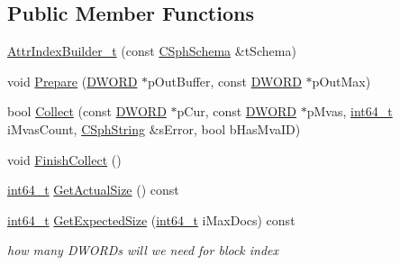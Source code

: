\subsection*{Public Member Functions}
\begin{DoxyCompactItemize}
\item 
\hyperlink{classAttrIndexBuilder__t_a71d062d94bfdbb5e61d8c8fbbb336bfe}{Attr\-Index\-Builder\-\_\-t} (const \hyperlink{classCSphSchema}{C\-Sph\-Schema} \&t\-Schema)
\item 
void \hyperlink{classAttrIndexBuilder__t_ae28f6c66df2182b4e243ec47123c2fd4}{Prepare} (\hyperlink{sphinxstd_8h_a798af1e30bc65f319c1a246cecf59e39}{D\-W\-O\-R\-D} $\ast$p\-Out\-Buffer, const \hyperlink{sphinxstd_8h_a798af1e30bc65f319c1a246cecf59e39}{D\-W\-O\-R\-D} $\ast$p\-Out\-Max)
\item 
bool \hyperlink{classAttrIndexBuilder__t_ae6b926b095b016cf4f5de34815acf871}{Collect} (const \hyperlink{sphinxstd_8h_a798af1e30bc65f319c1a246cecf59e39}{D\-W\-O\-R\-D} $\ast$p\-Cur, const \hyperlink{sphinxstd_8h_a798af1e30bc65f319c1a246cecf59e39}{D\-W\-O\-R\-D} $\ast$p\-Mvas, \hyperlink{sphinxstd_8h_a996e72f71b11a5bb8b3b7b6936b1516d}{int64\-\_\-t} i\-Mvas\-Count, \hyperlink{structCSphString}{C\-Sph\-String} \&s\-Error, bool b\-Has\-Mva\-I\-D)
\item 
void \hyperlink{classAttrIndexBuilder__t_ad51162d55c70e1f3e3c074aa7d135031}{Finish\-Collect} ()
\item 
\hyperlink{sphinxstd_8h_a996e72f71b11a5bb8b3b7b6936b1516d}{int64\-\_\-t} \hyperlink{classAttrIndexBuilder__t_ae197f9fe3698f40469af24e9a67539de}{Get\-Actual\-Size} () const 
\item 
\hyperlink{sphinxstd_8h_a996e72f71b11a5bb8b3b7b6936b1516d}{int64\-\_\-t} \hyperlink{classAttrIndexBuilder__t_a23471c5dceee242b6aa48546e70b0049}{Get\-Expected\-Size} (\hyperlink{sphinxstd_8h_a996e72f71b11a5bb8b3b7b6936b1516d}{int64\-\_\-t} i\-Max\-Docs) const 
\begin{DoxyCompactList}\small\item\em how many D\-W\-O\-R\-Ds will we need for block index \end{DoxyCompactList}\end{DoxyCompactItemize}

